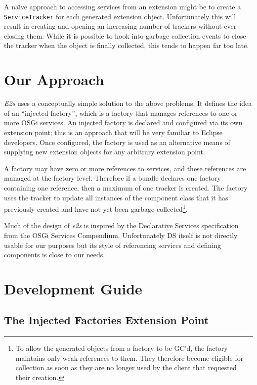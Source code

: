 \documentclass[12pt]{article}
\begin{document}
A na\"\i{}ve approach to accessing services from an extension might be to create a \texttt{ServiceTracker} for each generated extension object. Unfortunately this will result in creating and opening an increasing number of trackers without ever closing them. While it is possible to hook into garbage collection events to close the tracker when the object is finally collected, this tends to happen far too late.

\section{Our Approach}

\emph{E2s} uses a conceptually simple solution to the above problems. It defines the idea of an ``injected factory'', which is a factory that manages references to one or more OSGi services. An injected factory is declared and configured via its own extension point; this is an approach that will be very familiar to Eclipse developers. Once configured, the factory is used as an alternative means of supplying new extension objects for any arbitrary extension point.

A factory may have zero or more references to services, and these references are managed at the factory level. Therefore if a bundle declares one factory containing one reference, then a maximum of one tracker is created. The factory uses the tracker to update all instances of the component class that it has previously created and have not yet been garbage-collected\footnote{To allow the generated objects from a factory to be GC'd, the factory maintains only weak references to them. They therefore become eligible for collection as soon as they are no longer used by the client that requested their creation.}.

Much of the design of \emph{e2s} is inspired by the Declarative Services specification from the OSGi Services Compendium. Unfortunately DS itself is not directly usable for our purposes but its style of referencing services and defining components is close to our needs.

\section{Development Guide}

\subsection{The Injected Factories Extension Point}
\end{document}
